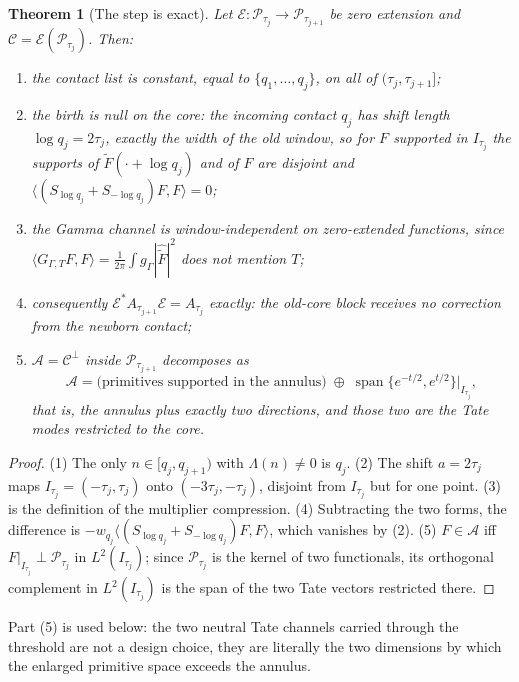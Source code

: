 \documentclass[11pt]{amsart}
\newtheorem{theorem}{Theorem}[section]
\theoremstyle{definition}
\theoremstyle{remark}
\begin{document}
\begin{theorem}[The step is exact]\label{thm:exactstep}
Let \(\mathcal E:\mathcal P_{\tau_j}\to\mathcal P_{\tau_{j+1}}\) be zero
extension and \(\mathcal C=\mathcal E(\mathcal P_{\tau_j})\).  Then:
\begin{enumerate}
\item the contact list is constant, equal to \(\{q_1,\dots,q_j\}\), on all of
\((\tau_j,\tau_{j+1}]\);
\item \emph{the birth is null on the core}: the incoming contact \(q_j\) has
shift length \(\log q_j=2\tau_j\), exactly the width of the old window, so
for \(F\) supported in \(I_{\tau_j}\) the supports of
\(\widetilde F(\cdot+\log q_j)\) and of \(F\) are disjoint and
\(\langle(S_{\log q_j}+S_{-\log q_j})F,F\rangle=0\);
\item the Gamma channel is window-independent on zero-extended functions,
since \(\langle G_{\Gamma,T}F,F\rangle
 =\frac1{2\pi}\int g_\Gamma|\widehat{\widetilde F}|^2\) does not mention
\(T\);
\item consequently \(\mathcal E^*A_{\tau_{j+1}}\mathcal E=A_{\tau_j}\)
\emph{exactly}: the old-core block receives no correction from the newborn
contact;
\item \(\mathcal A=\mathcal C^\perp\) inside \(\mathcal P_{\tau_{j+1}}\)
decomposes as
\[
 \mathcal A=\bigl(\text{primitives supported in the annulus}\bigr)
 \;\oplus\;
 \operatorname{span}\{e^{-t/2},e^{t/2}\}\big|_{I_{\tau_j}},
\]
that is, the annulus \emph{plus exactly two} directions, and those two are
the Tate modes restricted to the core.
\end{enumerate}
\end{theorem}

\begin{proof}
(1) The only \(n\in[q_j,q_{j+1})\) with \(\Lambda(n)\ne0\) is \(q_j\).
(2) The shift \(a=2\tau_j\) maps \(I_{\tau_j}=(-\tau_j,\tau_j)\) onto
\((-3\tau_j,-\tau_j)\), disjoint from \(I_{\tau_j}\) but for one point.
(3) is the definition of the multiplier compression.  (4) Subtracting the two
forms, the difference is
\(-w_{q_j}\langle(S_{\log q_j}+S_{-\log q_j})F,F\rangle\), which vanishes by
(2).  (5) \(F\in\mathcal A\) iff \(F|_{I_{\tau_j}}\perp\mathcal P_{\tau_j}\)
in \(L^2(I_{\tau_j})\); since \(\mathcal P_{\tau_j}\) is the kernel of two
functionals, its orthogonal complement in \(L^2(I_{\tau_j})\) is the span of
the two Tate vectors restricted there.
\end{proof}

Part (5) is used below: the two neutral Tate channels carried through the
threshold are not a design choice, they are literally the two dimensions by
which the enlarged primitive space exceeds the annulus.
\end{document}
